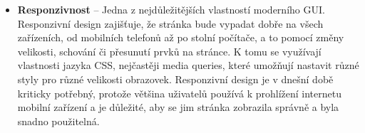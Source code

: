 \begin{itemize}
  \item \textbf{Responzivnost} -- Jedna z nejdůležitějších vlastností moderního GUI. Responzivní design zajišťuje, že stránka bude vypadat dobře na všech zařízeních, od mobilních telefonů až po stolní počítače, a to pomocí změny velikosti, schování či přesunutí prvků na stránce. K tomu se využívají vlastnosti jazyka CSS, nejčastěji media queries, které umožňují nastavit různé styly pro různé velikosti obrazovek. Responzivní design je v dnešní době kriticky potřebný, protože většina uživatelů používá k prohlížení internetu mobilní zařízení a je důležité, aby se jim stránka zobrazila správně a byla snadno použitelná.
\end{itemize}

